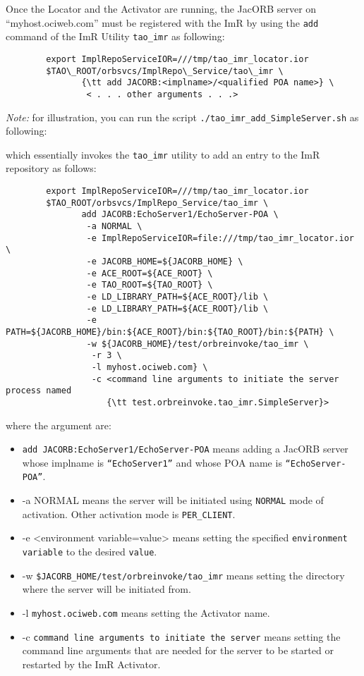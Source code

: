 Once the Locator and the Activator are running, the JacORB server on
“myhost.ociweb.com” must be registered with the ImR by using the
{\tt add} command of the ImR Utility {\tt tao\_imr} as following:

\begin{verbatim}
        export ImplRepoServiceIOR=///tmp/tao_imr_locator.ior
        $TAO\_ROOT/orbsvcs/ImplRepo\_Service/tao\_imr \
               {\tt add JACORB:<implname>/<qualified POA name>} \
                < . . . other arguments . . .>
\end{verbatim}

\emph{Note:} for illustration, you can run the script
{\tt ./tao\_imr\_add\_SimpleServer.sh} as following:


which essentially invokes the {\tt tao\_imr} utility to add an entry to
the ImR repository as follows:

\begin{verbatim}
        export ImplRepoServiceIOR=///tmp/tao_imr_locator.ior
        $TAO_ROOT/orbsvcs/ImplRepo_Service/tao_imr \
               add JACORB:EchoServer1/EchoServer-POA \
                -a NORMAL \
                -e ImplRepoServiceIOR=file:///tmp/tao_imr_locator.ior \
                -e JACORB_HOME=${JACORB_HOME} \
                -e ACE_ROOT=${ACE_ROOT} \
                -e TAO_ROOT=${TAO_ROOT} \
                -e LD_LIBRARY_PATH=${ACE_ROOT}/lib \
                -e LD_LIBRARY_PATH=${ACE_ROOT}/lib \
                -e PATH=${JACORB_HOME}/bin:${ACE_ROOT}/bin:${TAO_ROOT}/bin:${PATH} \
                -w ${JACORB_HOME}/test/orbreinvoke/tao_imr \
                 -r 3 \
                 -l myhost.ociweb.com} \
                 -c <command line arguments to initiate the server process named
                    {\tt test.orbreinvoke.tao_imr.SimpleServer}>
\end{verbatim}

where the argument are:
\begin{itemize}
    \item {\tt add JACORB:EchoServer1/EchoServer-POA} means
             adding a JacORB server whose implname is {\tt “EchoServer1”}
             and whose POA name is {\tt “EchoServer-POA”}.
    \item -a NORMAL means the server will be initiated using
             {\tt NORMAL} mode of activation.  Other activation mode
              is {\tt PER\_CLIENT}.
    \item -e <environment variable=value> means setting the specified
              {\tt environment variable} to the desired {\tt value}.
    \item -w {\tt \${JACORB\_HOME}/test/orbreinvoke/tao\_imr} means setting
               the directory where the server will be initiated from.
    \item -l {\tt myhost.ociweb.com} means setting the Activator name.
    \item -c {\tt command line arguments to initiate the server} means
               setting the command line arguments that are needed for the server
               to be started or restarted by the ImR Activator.
\end{itemize}

